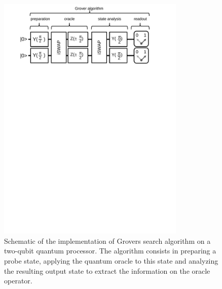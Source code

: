 \begin{figure}[ht!]
	\centering
		\includegraphics[width=0.8\textwidth]{./material/papers/grover/figures/grover_algorithm_schematic}
	\caption[Schematic of the implementation of Grovers search algorithm]{Schematic of the implementation of Grovers search algorithm on a two-qubit quantum processor. The algorithm consists in preparing a probe state, applying the quantum oracle to this state and analyzing the resulting output state to extract the information on the oracle operator.} 
	\label{fig:grover_algorithm_schematic}
\end{figure}

